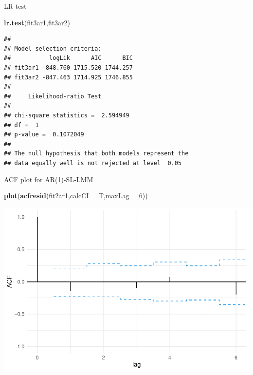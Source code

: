 \documentclass[
  ignorenonframetext,
]{beamer}
\newenvironment{Shaded}{\begin{snugshade}}{\end{snugshade}}
\newcommand{\DataTypeTok}[1]{\textcolor[rgb]{0.13,0.29,0.53}{#1}}
\newcommand{\DecValTok}[1]{\textcolor[rgb]{0.00,0.00,0.81}{#1}}
\newcommand{\KeywordTok}[1]{\textcolor[rgb]{0.13,0.29,0.53}{\textbf{#1}}}
\newcommand{\NormalTok}[1]{#1}
\begin{document}
\begin{frame}[fragile]{LR test}
\protect\hypertarget{lr-test}{}

\small

\begin{Shaded}
\begin{Highlighting}[]
\KeywordTok{lr.test}\NormalTok{(fit3ar1,fit3ar2)}
\end{Highlighting}
\end{Shaded}

\begin{verbatim}
## 
## Model selection criteria:
##           logLik      AIC      BIC
## fit3ar1 -848.760 1715.520 1744.257
## fit3ar2 -847.463 1714.925 1746.855
## 
##     Likelihood-ratio Test
## 
## chi-square statistics =  2.594949 
## df =  1 
## p-value =  0.1072049 
## 
## The null hypothesis that both models represent the 
## data equally well is not rejected at level  0.05
\end{verbatim}

\end{frame}

\begin{frame}[fragile]{ACF plot for AR(1)-SL-LMM}
\protect\hypertarget{acf-plot-for-ar1-sl-lmm}{}

\begin{Shaded}
\begin{Highlighting}[]
\KeywordTok{plot}\NormalTok{(}\KeywordTok{acfresid}\NormalTok{(fit2ar1,}\DataTypeTok{calcCI =}\NormalTok{ T,}\DataTypeTok{maxLag =} \DecValTok{6}\NormalTok{))}
\end{Highlighting}
\end{Shaded}

\begin{center}\includegraphics[width=0.85\linewidth]{codes_files/figure-beamer/acf1-1} \end{center}

\end{frame}
\end{document}
